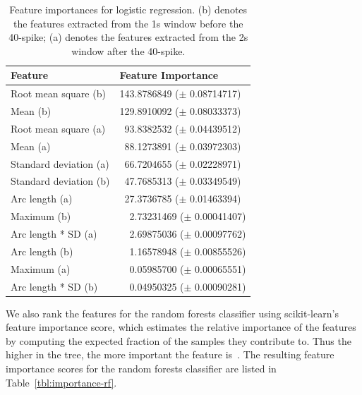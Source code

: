 \begin{table}[t]
\centering
\begin{tabular}{@{}ll@{}}
\toprule
Feature                & Feature Importance \\ \midrule
Root mean square (b)   &   143.8786849  ($\pm$ 0.08714717)       \\
Mean (b)               &   129.8910092 ($\pm$ 0.08033373)       \\ 
Root mean square (a)   &  \ 93.8382532  ($\pm$ 0.04439512)       \\
Mean (a)               &  \ 88.1273891  ($\pm$ 0.03972303)       \\
Standard deviation (a) &  \ 66.7204655  ($\pm$ 0.02228971)       \\
Standard deviation (b) &  \ 47.7685313  ($\pm$ 0.03349549)       \\
Arc length (a)         &  \ 27.3736785  ($\pm$ 0.01463394)       \\
Maximum (b)            & \ \ 2.73231469 ($\pm$ 0.00041407)       \\
Arc length * SD (a)    & \ \ 2.69875036 ($\pm$ 0.00097762)       \\
Arc length (b)         & \ \ 1.16578948 ($\pm$ 0.00855526)       \\
Maximum (a)            & \ \ 0.05985700 ($\pm$ 0.00065551)       \\
Arc length * SD (b)    & \ \ 0.04950325 ($\pm$ 0.00090281)       \\ \bottomrule

\end{tabular}
\caption{Feature importances for logistic regression. (b) denotes the features extracted from the 1s window before the 40-spike; (a) denotes the features extracted from the 2s window after the 40-spike.}
\label{tbl:importance-lr}
\end{table}

We also rank the features for the random forests classifier using scikit-learn's feature importance score, which estimates the relative importance of the features by computing the expected fraction of the samples they contribute to. 
Thus the higher in the tree, the more important the feature is~\cite{sklearn:rfdoc}. 
The resulting feature importance scores for the random forests classifier are listed in Table~\ref{tbl:importance-rf}.


